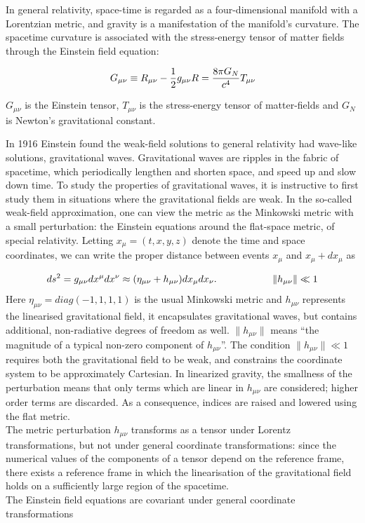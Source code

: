 \documentclass[binding=0.6cm, LaM]{sapthesis}
\begin{document}
	In general relativity, space-time is regarded as a four-dimensional manifold 
	with a Lorentzian metric, and gravity is a manifestation of the manifold’s curvature. 
	The spacetime curvature is associated with the stress-energy tensor 
	of matter fields through the Einstein field equation:

		\begin{equation}
		G_{\mu\nu} \equiv R_{\mu\nu}  - {1 \over 2}g_{\mu\nu}R = {8\pi G_{N} \over {c^4}}T_{\mu\nu} 
		\end{equation}

	$G_{\mu\nu} $ is the Einstein tensor, $T_{\mu\nu} $ is the stress-energy 
	tensor of matter-fields and $ G_{N}$ is Newton’s gravitational constant. 

	In 1916 Einstein found the weak-field solutions to general relativity had wave-like solutions, gravitational waves.
	Gravitational waves are ripples in the fabric of spacetime, 
	which periodically lengthen and shorten space, and speed up and slow down time.
 	To study the properties of gravitational waves, it is instructive to first study them 
	in situations where the gravitational fields are weak.
	In the so-called weak-field approximation, one can view the metric as the Minkowski metric 
	with a small perturbation: the Einstein equations around the flat-space metric, of special relativity.
	Letting $ x_\mu = (t, x, y, z)$ denote the time and space coordinates, 
	we can write the proper distance between events $x_{\mu}$ and $x_{\mu} + dx_{\mu}$ as
		
		\[
		ds^2 = g_{\mu\nu}dx^{\mu}dx^{\nu} \approx (\eta_{\mu\nu} + h_{\mu\nu})dx_{\mu}dx_{\nu}. \hspace*{2cm}\|h_{\mu\nu}\|\ll 1
		\]
	Here $\eta_{\mu\nu} = diag(-1,1,1,1)$ is the usual Minkowski metric and $h_{\mu\nu}$ 
	represents the linearised gravitational field, it encapsulates gravitational waves, 
	but contains additional, non-radiative degrees of freedom as well. $\|h_{\mu\nu}\|$ means
	“the magnitude of a typical non-zero component of $h_{\mu\nu}$”. 
	The condition $\|h_{\mu\nu}\|\ll 1$ requires both the gravitational field to be weak, 
	and constrains the coordinate system to be approximately Cartesian.  
	In linearized gravity, the smallness of the perturbation means that only terms which are linear in $h_{\mu\nu}$ are considered;
	higher order terms are discarded. As a consequence, indices are raised and lowered using the flat metric. \\
	The metric perturbation $h_{\mu\nu}$ transforms as a tensor under Lorentz transformations, 
	but not under general coordinate transformations: since the numerical values of the components
	of a tensor depend on the reference frame, there exists a reference frame in which 
	the linearisation of the gravitational field holds on a sufficiently large region of the spacetime. \\
	The Einstein field equations are covariant under general coordinate transformations
\end{document}
